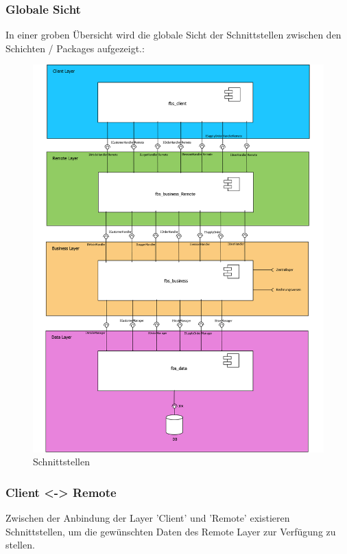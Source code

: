 \subsubsection{Globale Sicht}
In einer groben Übersicht wird die globale Sicht der Schnittstellen zwischen den Schichten / Packages aufgezeigt.:\\
\begin{figure}[H]
\centering
	\includegraphics[width=1.0\linewidth]{Images/Schnittstellen}
	\caption{Schnittstellen}
	\label{fig:schnittstellen}
\end{figure}

\clearpage






\subsubsection{Client <-> Remote}
Zwischen der Anbindung der Layer 'Client' und 'Remote' existieren Schnittstellen, um die gewünschten Daten des Remote Layer zur Verfügung zu stellen.\\\\

